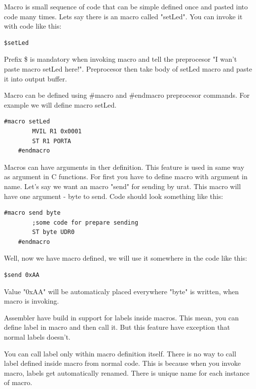 Macro is small sequence of code that can be simple defined once and pasted into
code many times. Lets say there is an macro called "setLed". You can invoke it
with code like this:

\begin{lstlisting}[language={[x86masm]Assembler}, frame=single]
    $setLed
\end{lstlisting}

Prefix \$ is mandatory when invoking macro and tell the preprocesor "I wan't
paste macro setLed here!". Preprocesor then take body of setLed macro and paste
it into output buffer.

Macro can be defined using \#macro and \#endmacro preprocesor commands. For
example we will define macro setLed.

\begin{lstlisting}[language={[x86masm]Assembler}, frame=single]
    #macro setLed
        MVIL R1 0x0001
        ST R1 PORTA
    #endmacro
\end{lstlisting}

Macros can have arguments in ther definition. This feature is used in same way
as argument in C functions. For first you have to define macro with argument in
name. Let's say we want an macro "send" for sending by urat. This macro will
have one argument - byte to send. Code should look something like this:

\begin{lstlisting}[language={[x86masm]Assembler}, frame=single]
    #macro send byte
        ;some code for prepare sending
        ST byte UDR0
    #endmacro
\end{lstlisting}

Well, now we have macro defined, we will use it somewhere in the code like this:

\begin{lstlisting}[language={[x86masm]Assembler}, frame=single]
    $send 0xAA
\end{lstlisting}

Value "0xAA" will be automaticaly placed everywhere "byte" is written, when
macro is invoking.

Assembler have build in support for labels inside macros. This mean, you can
define label in macro and then call it. But this feature have exception that
normal labels doesn't.

You can call label only within macro definition itself. There is no way to call
label defined inside macro from normal code. This is because when you invoke
macro, labels get automatically renamed. There is unique name for each instance
of macro.

